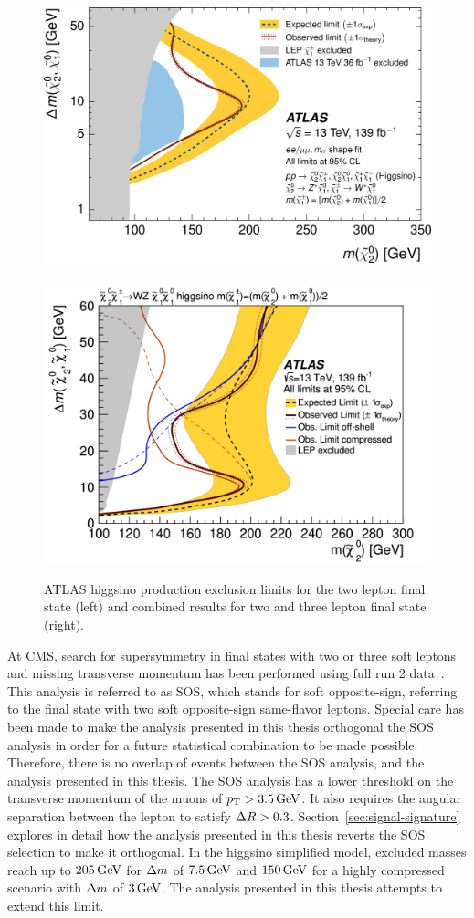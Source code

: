 \begin{figure}[!htb]
\centering
\includegraphics[width=0.48\linewidth]{plots/prev_results/ATLAS_1911_12606.png} \,
\includegraphics[width=0.48\linewidth]{plots/prev_results/ATLAS-Higgsino-combined_2106_01676.png}  \\
\caption[ATLAS higgsino production exclusion limits]{ATLAS higgsino production exclusion limits for the two lepton final state (left) and combined results for two and three lepton final state (right).}
\label{fig:atlas-limits}
\end{figure}

At CMS, search for supersymmetry in final states with two or three soft leptons and missing transverse momentum has been performed using full run 2 data~\cite{sos}. This analysis is referred to as SOS, which stands for soft opposite-sign, referring to the final state with two soft opposite-sign same-flavor leptons. Special care has been made to make the analysis presented in this thesis orthogonal the SOS analysis in order for a future statistical combination to be made possible. Therefore, there is no overlap of events between the SOS analysis, and the analysis presented in this thesis. The SOS analysis has a lower threshold on the transverse momentum of the muons of $p_{\mathrm{T}} > 3.5\,\text{Ge\hspace{-.08em}V}$. It also requires the angular separation between the lepton to satisfy $\Delta R>0.3$. Section~\ref{sec:signal-signature} explores in detail how the analysis presented in this thesis reverts the SOS selection to make it orthogonal. In the higgsino simplified model, excluded masses reach up to $205 \,\text{Ge\hspace{-.08em}V}$ for $\Delta m$ of $7.5 \,\text{Ge\hspace{-.08em}V}$ and $150 \,\text{Ge\hspace{-.08em}V}$ for a highly compressed scenario with $\Delta m$ of $3 \,\text{Ge\hspace{-.08em}V}$. The analysis presented in this thesis attempts to extend this limit.

